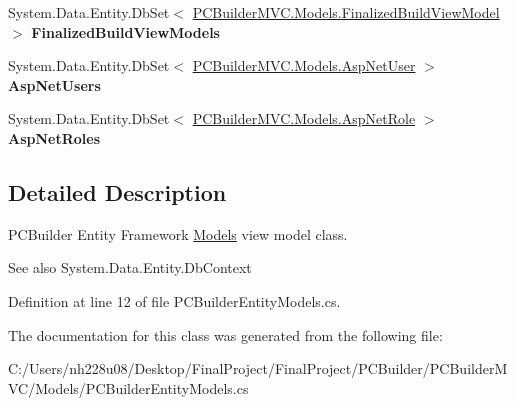 \begin{DoxyCompactItemize}
\item 
System.\+Data.\+Entity.\+Db\+Set$<$ \hyperlink{class_p_c_builder_m_v_c_1_1_models_1_1_finalized_build_view_model}{P\+C\+Builder\+M\+V\+C.\+Models.\+Finalized\+Build\+View\+Model} $>$ {\bfseries Finalized\+Build\+View\+Models}\hypertarget{class_p_c_builder_m_v_c_1_1_models_1_1_p_c_builder_entity_models_a6cb50b4dd2ce526459e7dc52381fc627}{}\label{class_p_c_builder_m_v_c_1_1_models_1_1_p_c_builder_entity_models_a6cb50b4dd2ce526459e7dc52381fc627}

\item 
System.\+Data.\+Entity.\+Db\+Set$<$ \hyperlink{class_p_c_builder_m_v_c_1_1_models_1_1_asp_net_user}{P\+C\+Builder\+M\+V\+C.\+Models.\+Asp\+Net\+User} $>$ {\bfseries Asp\+Net\+Users}\hypertarget{class_p_c_builder_m_v_c_1_1_models_1_1_p_c_builder_entity_models_a4b38df58c1b0bb6500f88dbbd6b5e2d0}{}\label{class_p_c_builder_m_v_c_1_1_models_1_1_p_c_builder_entity_models_a4b38df58c1b0bb6500f88dbbd6b5e2d0}

\item 
System.\+Data.\+Entity.\+Db\+Set$<$ \hyperlink{class_p_c_builder_m_v_c_1_1_models_1_1_asp_net_role}{P\+C\+Builder\+M\+V\+C.\+Models.\+Asp\+Net\+Role} $>$ {\bfseries Asp\+Net\+Roles}\hypertarget{class_p_c_builder_m_v_c_1_1_models_1_1_p_c_builder_entity_models_a89e01a79119dd60e1149e6be03f6cf81}{}\label{class_p_c_builder_m_v_c_1_1_models_1_1_p_c_builder_entity_models_a89e01a79119dd60e1149e6be03f6cf81}

\end{DoxyCompactItemize}


\subsection{Detailed Description}
P\+C\+Builder Entity Framework \hyperlink{namespace_p_c_builder_m_v_c_1_1_models}{Models} view model class. 

\begin{DoxySeeAlso}{See also}
System.\+Data.\+Entity.\+Db\+Context


\end{DoxySeeAlso}


Definition at line 12 of file P\+C\+Builder\+Entity\+Models.\+cs.



The documentation for this class was generated from the following file\+:\begin{DoxyCompactItemize}
\item 
C\+:/\+Users/nh228u08/\+Desktop/\+Final\+Project/\+Final\+Project/\+P\+C\+Builder/\+P\+C\+Builder\+M\+V\+C/\+Models/P\+C\+Builder\+Entity\+Models.\+cs\end{DoxyCompactItemize}

